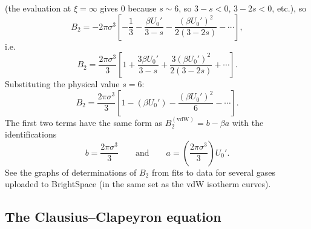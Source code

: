 (the evaluation at $\xi = \infty$ gives 0 because $s\sim 6$, so $3-s<0$, $3-2s<0$, etc.), so
\begin{equation}
  B_2 = -2\pi\sigma^3\left[-\frac{1}{3} - \frac{\beta U_0'}{3-s} - \frac{(\beta U_0')^2}{2(3-2s)} - \cdots\right],
\end{equation}
i.e.
\begin{equation}
  B_2 = \frac{2\pi\sigma^3}{3}\left[1 + \frac{3\beta U_0'}{3-s} + \frac{3(\beta U_0')^2}{2(3-2s)} + \cdots\right].
\end{equation}
Substituting the physical value $s = 6$:
\begin{equation}
  B_2 = \frac{2\pi\sigma^3}{3}\left[1 - (\beta U_0') - \frac{(\beta U_0')^2}{6} - \cdots\right].
\end{equation}
The first two terms have the same form as $B_2^{(\text{vdW})} = b-\beta a$ with the identifications
\begin{equation}
  b = \frac{2\pi\sigma^3}{3}\qquad\text{and}\qquad a = \left(\frac{2\pi\sigma^3}{3}\right)U_0' .
\end{equation}
See the graphs of determinations of $B_2$ from fits to data for several gases uploaded to BrightSpace (in the same
set as the vdW isotherm curves).

\subsection{The Clausius--Clapeyron equation}

